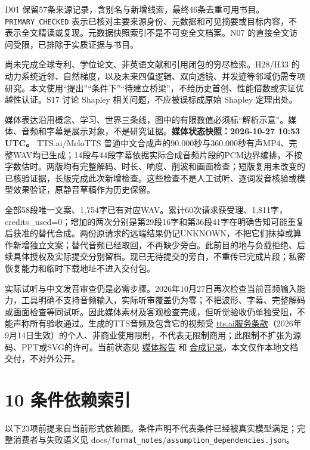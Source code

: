 \documentclass[
  10pt,
]{article}
\begin{document}
D01
保留57条来源记录，含别名与新增线索，最终46条去重可用书目。\nolinkurl{PRIMARY_CHECKED}
表示已核对主要来源身份、元数据和可见摘要或目标内容，不表示全文精读或复现。元数据快照索引不是不可变全文档案。N07
的直接全文访问受限，已排除于实质证据与书目。

尚未完成全球专利、学位论文、非英语文献和引用闭包的穷尽检索。H28/H33
的动力系统近邻、自然梯度，以及未来四值逻辑、双向透镜、并发迹等邻域仍需专项研究。本文使用``提出''``条件下''``待建立桥梁''，不给历史首创、性能倍数或实证优越性认证。S17
讨论 Shapley 相关问题，不应被误标成原始 Shapley 定理出处。

媒体表达沿用概念、学习、世界三条线，图中的有限数值必须标``解析示意''。媒体、音频和字幕是展示对象，不是研究证据。\textbf{媒体状态快照：2026-10-27
10:53 UTC。} TTS.ai/MeloTTS
普通中文合成声的90.000秒与360.000秒有声MP4、完整WAV均已生成；14段与44段字幕依据实际合成音频片段的PCM边界编排，不按字数估时。两版均有完整解码、时长、响度、削波和画面检查；短版复用未改变的已核验证据，长版完成此次新增检查。这些检查不是人工试听、逐词发音核验或模型效果验证，原静音草稿作为历史保留。

全部58段唯一文案、1,754字已有对应WAV。累计60次请求获受理、1,811字，credits\_used=0；增加的两次分别是第29段16字和第36段41字在明确告知可能重复后获准的替代合成。两份原请求的远端结果仍记UNKNOWN，不把它们抹掉或算作新增独立文案；替代音频已经取回，不再缺少旁白。此前目的地与负载拒绝、后续具体授权及实际提交分别留档。现已无待提交的旁白，不重传已完成片段；私密恢复能力和临时下载地址不进入交付包。

实际试听与中文发音审查仍是必需步骤。2026年10月27日再次检查当前音频输入能力，工具明确不支持音频输入，实际听审覆盖仍为零；不把波形、字幕、完整解码或画面检查等同试听。因此媒体素材及客观检查完成，但听觉验收仍单独受阻，不能声称所有验收通过。生成的TTS音频及包含它的视频受
\href{https://tts.ai/terms/}{tts.ai服务条款}（2026年9月14日生效）的个人、非商业使用限制，不代表无限制商用；此限制不扩张为源码、PPT或SVG的许可。当前状态见
\href{reports/media_qa.json}{媒体报告} 和
\href{assets/audio/tts_ai/generation_summary.json}{合成记录}。本文仅作本地文档交付，不对外公开。

\section{10 条件依赖索引}\label{ux6761ux4ef6ux4f9dux8d56ux7d22ux5f15}

以下23项前提来自当前形式依赖图。条件声明不代表条件已经被真实模型满足；完整消费者与失败语义见
docs/\nolinkurl{formal_notes}/\nolinkurl{assumption_dependencies.json}。
\end{document}
